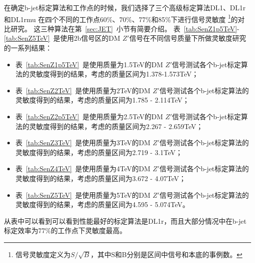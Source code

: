在确定b-jet标定算法和工作点的时候，我们选择了三个高级标定算法DL1、DL1r和DL1rmu
在四个不同的工作点60\%、70\%、77\%和85\%下进行信号灵敏度
\footnote{信号灵敏度定义为$S/\sqrt{B}$，其中S和B分别是区间中信号和本底的事例数。}的对比研究。
这三种算法在第~\ref{sec:JET}~小节有简要介绍。
表~\ref{tab:SenZ1p5TeV}-\ref{tab:SenZ5TeV}~是使用2b信号区的DM $Z\prime$信号在不同信号质量下所做灵敏度研究的一系列结果：
\begin{itemize}
	\item 表~\ref{tab:SenZ1p5TeV}~是使用质量为1.5TeV的DM $Z\prime$信号测试各个b-jet标定算法的灵敏度得到的结果，考虑的质量区间为1.378-1.573TeV；
	\item 表~\ref{tab:SenZ2TeV}~是使用质量为2TeV的DM $Z\prime$信号测试各个b-jet标定算法的灵敏度得到的结果，考虑的质量区间为1.785 - 2.114TeV；
	\item 表~\ref{tab:SenZ2p5TeV}~是使用质量为2.5TeV的DM $Z\prime$信号测试各个b-jet标定算法的灵敏度得到的结果，考虑的质量区间为2.267 - 2.659TeV；
	\item 表~\ref{tab:SenZ3TeV}~是使用质量为3TeV的DM $Z\prime$信号测试各个b-jet标定算法的灵敏度得到的结果，考虑的质量区间为2.719 - 3.1TeV；
	\item 表~\ref{tab:SenZ4TeV}~是使用质量为4TeV的DM $Z\prime$信号测试各个b-jet标定算法的灵敏度得到的结果，考虑的质量区间为3.672 - 4.07TeV；
	\item 表~\ref{tab:SenZ5TeV}~是使用质量为5TeV的DM $Z\prime$信号测试各个b-jet标定算法的灵敏度得到的结果，考虑的质量区间为4.595 - 5.074TeV。
\end{itemize}
从表中可以看到可以看到性能最好的标定算法是DL1r，而且大部分情况中在b-jet标定效率为$77\%$的工作点下灵敏度最高。


